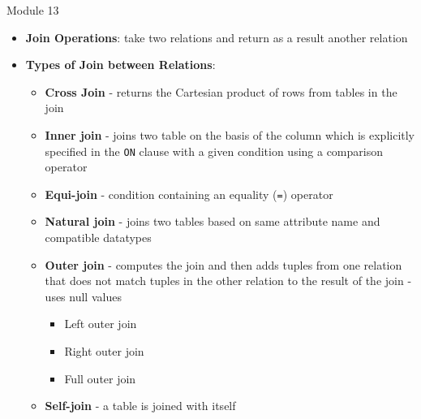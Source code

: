 \documentclass[aspectratio=169, xcolor=dvipsnames]{beamer}
\begin{document}
\begin{frame}{Module 13}
    \begin{itemize}[<+->]
        \item \textbf{Join Operations}: take two relations and return as a result another relation
        \item \textbf{Types of Join between Relations}:
        \begin{itemize}
            \item[$\triangleright$] \textbf{Cross Join} - returns the Cartesian product of rows from tables in the join
            \item[$\triangleright$] \textbf{Inner join} - joins two table on the basis of the column which is explicitly specified in the \texttt{ON} clause with a given condition using a comparison operator
            \item[$\triangleright$] \textbf{Equi-join} - condition containing an equality (\texttt{=}) operator
            \item[$\triangleright$] \textbf{Natural join} - joins two tables based on same attribute name and compatible datatypes
            \item[$\triangleright$] \textbf{Outer join} - computes the join and then adds tuples from one relation that does not match tuples in the other relation to the result of the join - uses null values
            \begin{itemize}
                \item[$\star$] Left outer join
                \item[$\star$] Right outer join
                \item[$\star$] Full outer join
            \end{itemize}
            \item[$\triangleright$] \textbf{Self-join} - a table is joined with itself
        \end{itemize}
    \end{itemize}
\end{frame}
\end{document}
